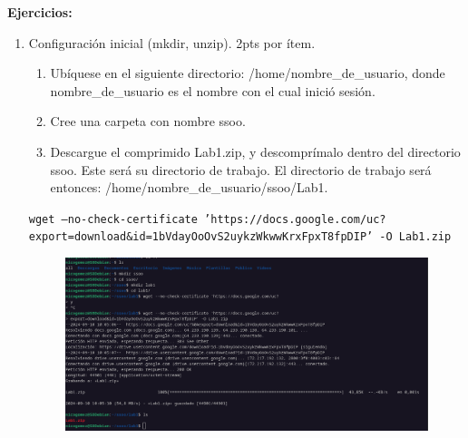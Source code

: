 \documentclass{templateNote}
\begin{document}

\portada
\margenes


\textbf{Ejercicios:}
\begin{enumerate}
    \item Configuración inicial (mkdir, unzip). 2pts por ítem.
    \begin{enumerate}[label=\alph*)]
        \item Ubíquese en el siguiente directorio: /home/nombre\_de\_usuario, donde \\nombre\_de\_usuario es el nombre con el cual inició sesión.
        \item Cree una carpeta con nombre ssoo.
        \item Descargue el comprimido Lab1.zip, y descomprímalo dentro del directorio ssoo. Este será su directorio de trabajo. El directorio de trabajo será entonces: /home/nombre\_de\_usuario/ssoo/Lab1.
    \end{enumerate}
    \begin{center}
        \texttt{wget --no-check-certificate 'https://docs.google.com/uc?\\export=download\&id=1bVdayOoOvS2uykzWkwwKrxFpxT8fpDIP' -O Lab1.zip}
    \end{center}

    \begin{figure}[H]
        \centering
        \includegraphics[width=\textwidth]{img/ejerc1.png}
    \end{figure}


\end{enumerate}
\end{document}
